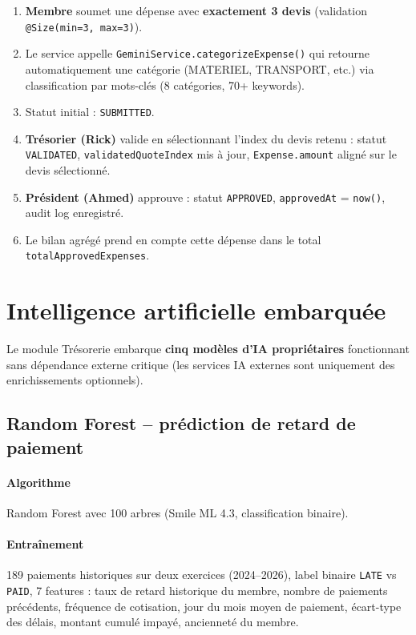 \documentclass[11pt,a4paper]{article}
\begin{document}
\begin{enumerate}[leftmargin=*]
  \item \textbf{Membre} soumet une dépense avec \textbf{exactement 3 devis} (validation \texttt{@Size(min=3, max=3)}).
  \item Le service appelle \texttt{GeminiService.categorizeExpense()} qui retourne automatiquement une catégorie (MATERIEL, TRANSPORT, etc.) via classification par mots-clés (8 catégories, 70+ keywords).
  \item Statut initial : \texttt{SUBMITTED}.
  \item \textbf{Trésorier (Rick)} valide en sélectionnant l'index du devis retenu : statut \texttt{VALIDATED}, \texttt{validatedQuoteIndex} mis à jour, \texttt{Expense.amount} aligné sur le devis sélectionné.
  \item \textbf{Président (Ahmed)} approuve : statut \texttt{APPROVED}, \texttt{approvedAt} = \texttt{now()}, audit log enregistré.
  \item Le bilan agrégé prend en compte cette dépense dans le total \texttt{totalApprovedExpenses}.
\end{enumerate}

\section{Intelligence artificielle embarquée}

Le module Trésorerie embarque \textbf{cinq modèles d'IA propriétaires} fonctionnant sans dépendance externe critique (les services IA externes sont uniquement des enrichissements optionnels).

\subsection{Random Forest -- prédiction de retard de paiement}

\paragraph{Algorithme} Random Forest avec 100 arbres (Smile ML 4.3, classification binaire).

\paragraph{Entraînement} 189 paiements historiques sur deux exercices (2024--2026), label binaire \texttt{LATE} vs \texttt{PAID}, 7 features : taux de retard historique du membre, nombre de paiements précédents, fréquence de cotisation, jour du mois moyen de paiement, écart-type des délais, montant cumulé impayé, ancienneté du membre.
\end{document}
